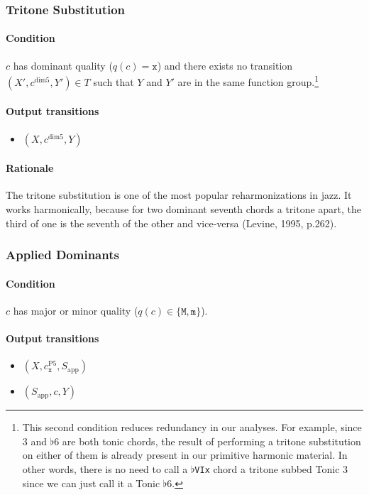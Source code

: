 \documentclass[]{article}
\begin{document}
\subsubsection{Tritone Substitution}
\label{sec:tritone_sub}
\paragraph{Condition} $c$ has dominant quality ($q(c) = \texttt{x}$) and there exists no transition $(X', c^\textrm{dim5}, Y') \in T$ such that $Y$ and $Y'$ are in the same function group.\footnote{This second condition reduces redundancy in our analyses.  For example, since 3 and $\flat$6 are both tonic chords, the result of performing a tritone substitution on either of them is already present in our primitive harmonic material.  In other words, there is no need to call a $\flat$\texttt{VIx} chord a tritone subbed Tonic 3 since we can just call it a Tonic $\flat$6.}

\paragraph{Output transitions}
\begin{itemize}
	\item $(X, c^\textrm{dim5}, Y)$
\end{itemize}

\paragraph{Rationale} The tritone substitution is one of the most popular reharmonizations in jazz.  It works harmonically, because for two dominant seventh chords a tritone apart, the third of one is the seventh of the other and vice-versa (Levine, 1995, p.262).

\subsubsection{Applied Dominants}
\paragraph{Condition} $c$ has major or minor quality ($q(c) \in \{\texttt{M}, \texttt{m}\}$).

\paragraph{Output transitions}
\begin{itemize}
	\item $(X, c_\texttt{x}^\textrm{P5}, S_\textrm{app})$
	\item $(S_\textrm{app}, c, Y)$
\end{itemize}
\end{document}
